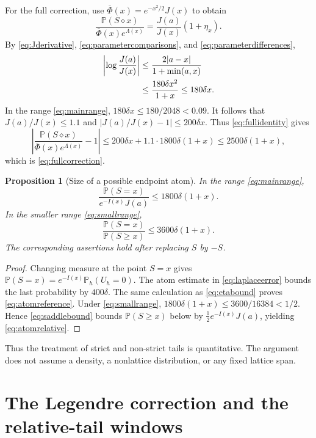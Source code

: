 \documentclass[11pt]{article}
\numberwithin{equation}{section}
\newtheorem{proposition}[theorem]{Proposition}
\theoremstyle{remark}
\newcommand{\Pp}{\mathbb P}
\newcommand{\Phibar}{\overline\Phi}
\begin{document}
For the full correction, use
$\Phibar(x)=e^{-x^2/2}J(x)$ to obtain
\begin{equation}\label{eq:fullidentity}
 \frac{\Pp(S\diamond x)}{\Phibar(x)e^{\Lambda(x)}}
 =\frac{J(a)}{J(x)}(1+\eta_x).
\end{equation}
By \eqref{eq:Jderivative}, \eqref{eq:parametercomparisons}, and
\eqref{eq:parameterdifferences},
\begin{align}
 \left|\log\frac{J(a)}{J(x)}\right|
 &\le\frac{2|a-x|}{1+\min(a,x)}\notag\\
 &\le\frac{180\delta x^2}{1+x}\le180\delta x.
 \label{eq:Jratio}
\end{align}
In the range \eqref{eq:mainrange}, $180\delta x\le180/2048<0.09$.
It follows that $J(a)/J(x)\le1.1$ and
$|J(a)/J(x)-1|\le200\delta x$. Thus \eqref{eq:fullidentity} gives
\[
 \left|\frac{\Pp(S\diamond x)}{\Phibar(x)e^{\Lambda(x)}}-1\right|
 \le200\delta x+1.1\cdot1800\delta(1+x)
 \le2500\delta(1+x),
\]
which is \eqref{eq:fullcorrection}.

\begin{proposition}[Size of a possible endpoint atom]\label{prop:atoms}
In the range \eqref{eq:mainrange},
\begin{equation}\label{eq:atomreference}
 \frac{\Pp(S=x)}{e^{-I(x)}J(a)}\le1800\delta(1+x).
\end{equation}
In the smaller range \eqref{eq:smallrange},
\begin{equation}\label{eq:atomrelative}
 \frac{\Pp(S=x)}{\Pp(S\ge x)}\le3600\delta(1+x).
\end{equation}
The corresponding assertions hold after replacing $S$ by $-S$.
\end{proposition}
\begin{proof}
Changing measure at the point $S=x$ gives
$\Pp(S=x)=e^{-I(x)}\Pp_h(U_h=0)$. The atom estimate in
\eqref{eq:laplaceerror} bounds the last probability by $400\delta$.
The same calculation as \eqref{eq:etabound} proves
\eqref{eq:atomreference}. Under \eqref{eq:smallrange},
$1800\delta(1+x)\le3600/16384<1/2$. Hence
\eqref{eq:saddlebound} bounds $\Pp(S\ge x)$ below by
$\tfrac12e^{-I(x)}J(a)$, yielding \eqref{eq:atomrelative}.
\end{proof}

Thus the treatment of strict and non-strict tails is quantitative. The
argument does not assume a density, a nonlattice distribution, or any fixed
lattice span.

\section{The Legendre correction and the relative-tail windows}
\label{sec:corrections}
\end{document}
